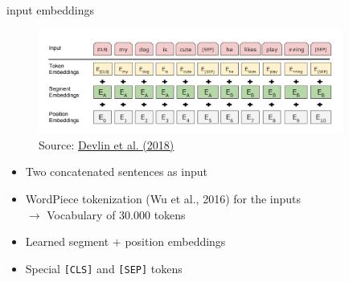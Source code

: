 \begin{vbframe}{input embeddings}

\begin{figure}
	\centering
	\includegraphics[width = 10cm]{figure/bert-input.png}\\ 
	\footnotesize{Source:} \href{https://arxiv.org/pdf/1810.04805.pdf}{Devlin et al. (2018)}
\end{figure}

\begin{itemize}
	\item Two concatenated sentences as input
	\item WordPiece tokenization (Wu et al., 2016) for the inputs\\
			$\rightarrow$ Vocabulary of 30.000 tokens
	\item Learned segment $+$ position embeddings
	\item Special \texttt{[CLS]} and \texttt{[SEP]} tokens
\end{itemize}

\end{vbframe}


\endlecture

